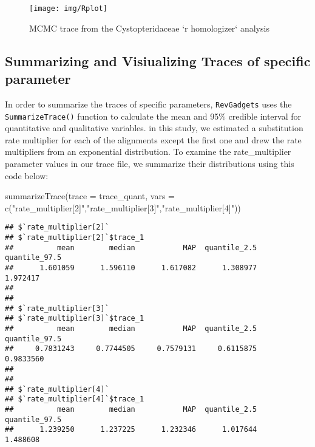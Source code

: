 \documentclass[
]{book}
\newenvironment{Shaded}{\begin{snugshade}}{\end{snugshade}}
\newcommand{\AttributeTok}[1]{\textcolor[rgb]{0.77,0.63,0.00}{#1}}
\newcommand{\FunctionTok}[1]{\textcolor[rgb]{0.00,0.00,0.00}{#1}}
\newcommand{\NormalTok}[1]{#1}
\newcommand{\StringTok}[1]{\textcolor[rgb]{0.31,0.60,0.02}{#1}}
\begin{document}
\begin{figure}

{\centering \texttt{[image: img/Rplot]} 

}

\caption{MCMC trace from the Cystopteridaceae `r homologizer` analysis}\label{fig:image4}
\end{figure}

\hypertarget{summarizing-and-visiualizing-traces-of-specific-parameter}{%
\subsection{Summarizing and Visiualizing Traces of specific parameter}\label{summarizing-and-visiualizing-traces-of-specific-parameter}}

In order to summarize the traces of specific parameters, \texttt{RevGadgets} uses the \texttt{SummarizeTrace()} function to calculate the mean and 95\% credible interval for quantitative and qualitative variables. in this study, we estimated a substitution rate multiplier for each of the alignments except the first one and drew the rate multipliers from an exponential distribution. To examine the rate\_multiplier parameter values in our trace file, we summarize their distributions using this code below:

\begin{Shaded}
\begin{Highlighting}[]
\FunctionTok{summarizeTrace}\NormalTok{(}\AttributeTok{trace =}\NormalTok{ trace\_quant, }\AttributeTok{vars =}  \FunctionTok{c}\NormalTok{(}\StringTok{"rate\_multiplier[2]"}\NormalTok{,}\StringTok{"rate\_multiplier[3]"}\NormalTok{,}\StringTok{"rate\_multiplier[4]"}\NormalTok{))}
\end{Highlighting}
\end{Shaded}

\begin{verbatim}
## $`rate_multiplier[2]`
## $`rate_multiplier[2]`$trace_1
##          mean        median           MAP  quantile_2.5 quantile_97.5 
##      1.601059      1.596110      1.617082      1.308977      1.972417 
## 
## 
## $`rate_multiplier[3]`
## $`rate_multiplier[3]`$trace_1
##          mean        median           MAP  quantile_2.5 quantile_97.5 
##     0.7831243     0.7744505     0.7579131     0.6115875     0.9833560 
## 
## 
## $`rate_multiplier[4]`
## $`rate_multiplier[4]`$trace_1
##          mean        median           MAP  quantile_2.5 quantile_97.5 
##      1.239250      1.237225      1.232346      1.017644      1.488608
\end{verbatim}
\end{document}
